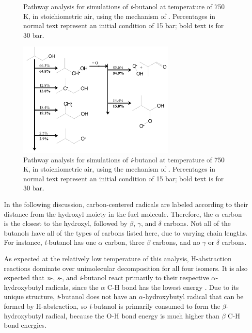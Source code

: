 \documentclass[12pt, letterpaper]{article}
\begin{document}
\begin{figure}
\begin{minipage}{7.9cm}
        \caption{Pathway analysis for simulations of \textit{t}-butanol at 
            temperature of 750 K, in stoichiometric air, using the mechanism of 
            \textcite{Sarathy2012}. Percentages in normal text represent an 
            initial condition of 15 bar; bold text is for 30 bar.}
        \label{fig:buoh-tpath}
    \end{minipage}
    \quad
    \begin{minipage}{7.9cm}
        \includegraphics[width=7.9cm]{03-Butanol/buoh-ipath}
        \caption{Pathway analysis for simulations of \textit{i}-butanol at 
            temperature of 750 K, in stoichiometric air, using the mechanism of 
            \textcite{Sarathy2012}. Percentages in normal text represent an 
            initial condition of 15 bar; bold text is for 30 bar.}
        \label{fig:buoh-ipath}
    \end{minipage}
\end{figure}

In the following discussion, carbon-centered radicals are labeled according to
their distance from the hydroxyl moiety in the fuel molecule. Therefore, the
$\alpha$ carbon is the closest to the hydroxyl, followed by $\beta$, $\gamma$,
and $\delta$ carbons. Not all of the butanols have all of the types of carbons
listed here, due to varying chain lengths. For instance, \textit{t}-butanol has
one $\alpha$ carbon, three $\beta$ carbons, and no $\gamma$ or $\delta$ carbons.

As expected at the relatively low temperature of this analysis, H-abstraction
reactions dominate over unimolecular decomposition for all four isomers. It is
also expected that \textit{n}-, \textit{s}-, and \textit{i}-butanol react
primarily to their respective $\alpha$-hydroxybutyl radicals, since the
$\alpha$ C-H bond has the lowest energy \cite{Sarathy2012}. Due to its unique
structure, \textit{t}-butanol does not have an $\alpha$-hydroxybutyl radical
that can be formed by H-abstraction, so \textit{t}-butanol is primarily
consumed to form the $\beta$-hydroxybutyl radical, because the O-H bond energy
is much higher than $\beta$ C-H bond energies.
\end{document}
